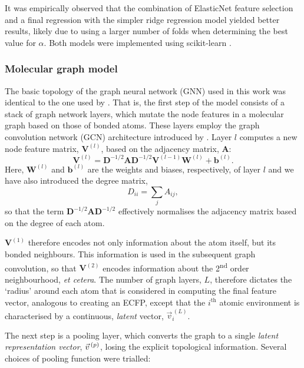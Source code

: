 It was empirically observed that the combination of ElasticNet feature selection
and a final regression with the simpler ridge regression model yielded better
results, likely due to using a larger number of folds when determining the best
value for $\alpha$. Both models were implemented using scikit-learn
\cite{pedregosaScikitlearnMachineLearning2011}.

\subsubsection{Molecular graph model}

The basic topology of the graph neural network (GNN) used in this work was
identical to the one used by \citet{qinPredictingCriticalMicelle2021}. That is,
the first step of the model consists of a stack of graph network layers, which
mutate the node features in a molecular graph based on those of bonded atoms.
These layers employ the graph convolution network (GCN) architecture introduced
by \cite{kipfSemiSupervisedClassificationGraph2017a}. Layer $l$ computes a new
node feature matrix, $\mathbf{V}^{(l)}$, based on the adjacency matrix,
$\mathbf{A}$:
\begin{equation}
    \mathbf{V}^{(l)} = \mathbf{D}^{-1/2} \mathbf{A} \mathbf{D}^{-1/2} \mathbf{V}^{(l-1)} \mathbf{W}^{(l)} + \mathbf{b}^{(l)}.
\end{equation}
Here, $\mathbf{W}^{(l)}$ and $\mathbf{b}^{(l)}$ are the weights and biases,
respectively, of layer $l$ and we have also introduced the degree matrix,
\begin{equation}
    D_{ii} = \sum_j A_{ij},
\end{equation}
so that the term $\mathbf{D}^{-1/2} \mathbf{A}
    \mathbf{D}^{-1/2}$ effectively normalises the adjacency matrix based on
the degree of each atom.

$\mathbf{V}^{(1)}$ therefore encodes not only information about the atom itself,
but its bonded neighbours. This information is used in the subsequent graph
convolution, so that $\mathbf{V}^{(2)}$ encodes information about the
2\textsuperscript{nd} order neighbourhood, \emph{et cetera}. The number of graph
layers, $L$, therefore dictates the `radius' around each atom that is considered
in computing the final feature vector, analogous to creating an ECFP, except
that the $i^\text{th}$ atomic environment is characterised by a continuous,
\emph{latent} vector, $\vec{v}^{\,(L)}_i$.

The next step is a pooling layer, which converts the graph to a single
\emph{latent representation vector}, $\vec{v}^{\,(p)}{}$, losing the explicit
topological information. Several choices of pooling function were trialled:

